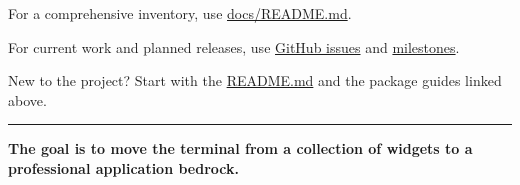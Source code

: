 For a comprehensive inventory, use \href{https://github.com/flyingrobots/bijou/blob/cbd70612140e7a450d764b3c7be1c6af878b99bc/docs/README.md}{docs/README.md}.

For current work and planned releases, use \href{https://github.com/flyingrobots/bijou/issues}{GitHub issues} and \href{https://github.com/flyingrobots/bijou/milestones}{milestones}.

New to the project? Start with the \href{https://github.com/flyingrobots/bijou/blob/cbd70612140e7a450d764b3c7be1c6af878b99bc/README.md}{README.md} and the package guides linked above.

\begin{center}\rule{0.5\linewidth}{0.5pt}\end{center}

\textbf{The goal is to move the terminal from a collection of widgets to a professional application bedrock.}

